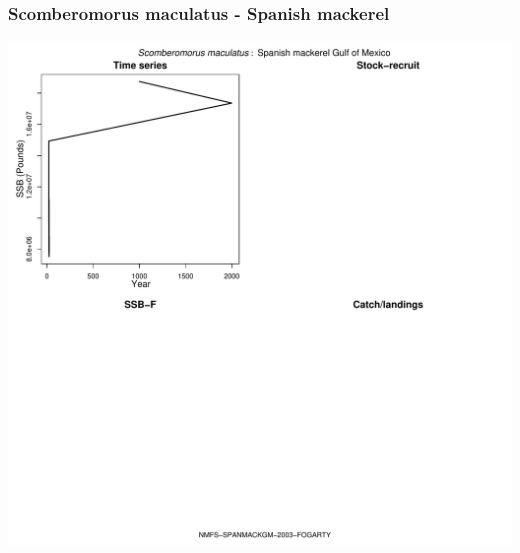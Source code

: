 \subsubsection{Scomberomorus maculatus - Spanish mackerel}
\begin{center}
\includegraphics[width=1.2\textwidth]{../R/figures/NMFS-SPANMACKGM-2003-FOGARTY.pdf}
\end{center}

